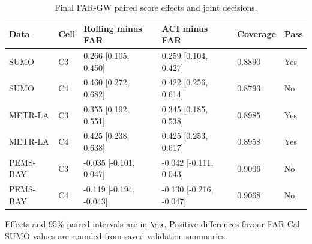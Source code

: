 \begin{table}[p]
\caption{Final FAR-GW paired score effects and joint decisions.}\label{tab:primary}
\centering\small
\begin{tabular}{llllll}\toprule
Data & Cell & Rolling minus FAR & ACI minus FAR & Coverage & Pass \\\midrule
SUMO & C3 & 0.266 [0.105, 0.450] & 0.259 [0.104, 0.427] & 0.8890 & Yes \\
SUMO & C4 & 0.460 [0.272, 0.682] & 0.422 [0.256, 0.614] & 0.8793 & No \\
METR-LA & C3 & 0.355 [0.192, 0.551] & 0.345 [0.185, 0.538] & 0.8985 & Yes \\
METR-LA & C4 & 0.425 [0.238, 0.638] & 0.425 [0.253, 0.617] & 0.8958 & Yes \\
PEMS-BAY & C3 & -0.035 [-0.101, 0.047] & -0.042 [-0.111, 0.043] & 0.9006 & No \\
PEMS-BAY & C4 & -0.119 [-0.194, -0.043] & -0.130 [-0.216, -0.047] & 0.9068 & No \\
\bottomrule\end{tabular}
\par\smallskip\footnotesize Effects and 95\% paired intervals are in $\ms$. Positive differences favour FAR-Cal. SUMO values are rounded from saved validation summaries.
\end{table}\clearpage
